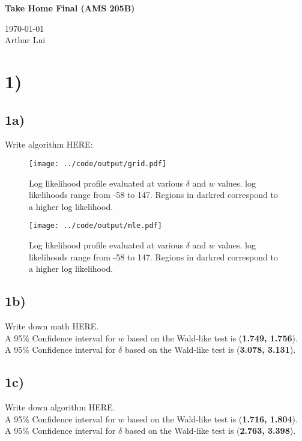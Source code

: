 \documentclass[11pt]{article}
\def\wl{\par \vspace{\baselineskip}\noindent}
\def\beginmyfig{\begin{figure}[H]\center} %
\def\endmyfig{\end{figure}}
\def\hline{ \textcolor{lgrey}{\hrulefill} }
\begin{document}
\begin{center}
  {\huge \textbf{Take Home Final (AMS 205B)}
  }\\
  \wl
  \noindent\today\\
  Arthur Lui\\
  \hline
\end{center}

\section*{1)}
\subsection*{1a)}
Write algorithm HERE:\\

\beginmyfig
  \texttt{[image: ../code/output/grid.pdf]}
  \caption{\small Log likelihood profile evaluated at various $\delta$ and $w$ values. log likelihoods range from -58 to 147. Regions in darkred correspond to a higher log likelihood.}
  \label{fig:grid}
\endmyfig

\beginmyfig
  \texttt{[image: ../code/output/mle.pdf]}
  \caption{\small Log likelihood profile evaluated at various $\delta$ and $w$ values. log likelihoods range from -58 to 147. Regions in darkred correspond to a higher log likelihood.}
  \label{fig:grid}
\endmyfig

\subsection*{1b)}
Write down math HERE.\\

\noindent
A 95\% Confidence interval for $w$ based on the Wald-like test is (\textbf{1.749, 1.756}).\\
A 95\% Confidence interval for $\delta$ based on the Wald-like test is (\textbf{3.078, 3.131}).

\subsection*{1c)}
Write down algorithm HERE.\\

\noindent
A 95\% Confidence interval for $w$ based on the Wald-like test is (\textbf{1.716, 1.804}).\\
A 95\% Confidence interval for $\delta$ based on the Wald-like test is (\textbf{2.763, 3.398}).\\
\end{document}
